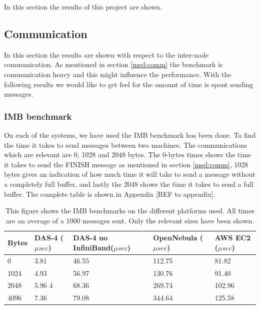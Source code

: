 In this section the results of this project are shown.

\subsection{Communication}
In this section the results are shown with respect to the inter-node communication. As mentioned in section \ref{med:comm} the benchmark is communication heavy and this might influence the performance. With the following results we would like to get feel for the amount of time is spent sending messages.

\subsubsection{IMB benchmark}
On each of the systems, we have used the IMB benchmark has been done. To find the time it takes to send messages between two machines. The communications which are relevant are 0, 1028 and 2048 bytes. The 0-bytes times shows the time it takes to send the FINISH message as mentioned in section \ref{med:comm}, 1028 bytes gives an indication of how much time it will take to send a message without a completely full buffer, and lastly the 2048 shows the time it takes to send a full buffer. The complete table is shown in Appendix [REF to appendix].
\begin{table}[!h]
\begin{tabular}{|l|l|l|l|l|}
\hline
Bytes & DAS-4 ($\mu sec$) & DAS-4 no InfiniBand($\mu sec$) & OpenNebula ($\mu sec$) & AWS EC2 ($\mu sec$)\\ \hline
0 & 3.81 &  46.55  & 112.75 &   81.82 \\ \hline
1024 & 4.93 & 56.97  &  130.76 &  91.40  \\ \hline 
2048 & 5.96 4 & 68.36 & 269.74 &  102.96 \\ \hline
4096 & 7.36 & 79.08  & 344.64 &  125.58  \\ \hline 
\end{tabular}
\caption{This figure shows the IMB benchmarks on the different platforms used. All times are an average of a 1000 messages sent. Only the relevant sizes have been shown.}
\label{tab:imb_bench}
\end{table}

